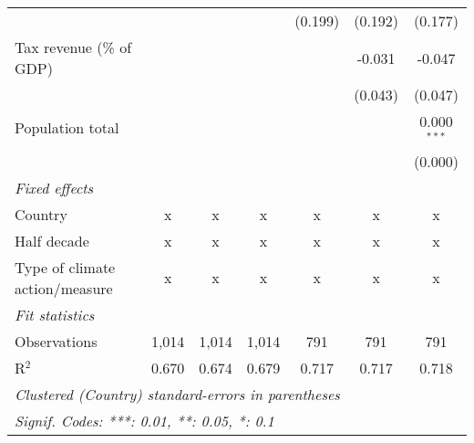 \begin{tabular}{lcccccc}
                                                      &         &                &                & (0.199)        & (0.192)        & (0.177)\\   
   Tax revenue (\% of GDP)                            &         &                &                &                & -0.031         & -0.047\\   
                                                      &         &                &                &                & (0.043)        & (0.047)\\   
   Population total                                   &         &                &                &                &                & 0.000$^{***}$\\   
                                                      &         &                &                &                &                & (0.000)\\   
   \emph{Fixed effects}\\
   Country                                            & x       & x              & x              & x              & x              & x\\  
   Half decade                                        & x       & x              & x              & x              & x              & x\\  
   Type of climate action/measure                     & x       & x              & x              & x              & x              & x\\  
   \midrule \emph{Fit statistics}\\
   Observations                                       & 1,014   & 1,014          & 1,014          & 791            & 791            & 791\\  
   R$^2$                                              & 0.670   & 0.674          & 0.679          & 0.717          & 0.717          & 0.718\\  
   \midrule
   \multicolumn{7}{l}{\emph{Clustered (Country) standard-errors in parentheses}}\\
   \multicolumn{7}{l}{\emph{Signif. Codes: ***: 0.01, **: 0.05, *: 0.1}}\\
\end{tabular}
\par\endgroup


